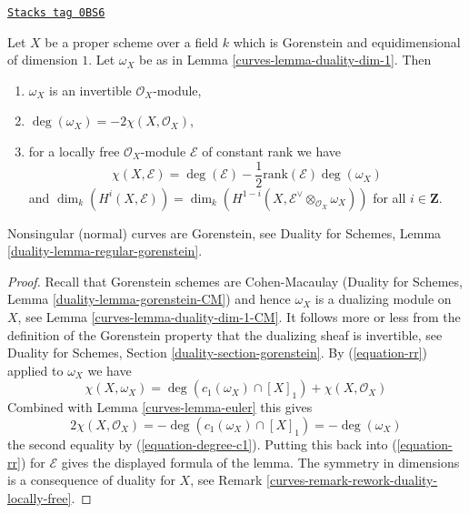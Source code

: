 \begin{lemma}

\label{curves-lemma-rr}
\href{https://stacks.math.columbia.edu/tag/0BS6}{\texttt{Stacks tag 0BS6}}

Let $X$ be a proper scheme over a field $k$ which is Gorenstein and
equidimensional of dimension $1$. Let $\omega_X$ be as in
Lemma \ref{curves-lemma-duality-dim-1}. Then
\begin{enumerate}
\item $\omega_X$ is an invertible $\mathcal{O}_X$-module,
\item $\deg(\omega_X) = -2\chi(X, \mathcal{O}_X)$,
\item for a locally free $\mathcal{O}_X$-module $\mathcal{E}$
of constant rank we have
$$
\chi(X, \mathcal{E}) = \deg(\mathcal{E}) -
\textstyle{\frac{1}{2}} \text{rank}(\mathcal{E}) \deg(\omega_X)
$$
and $\dim_k(H^i(X, \mathcal{E})) =
\dim_k(H^{1 - i}(X, \mathcal{E}^\vee \otimes_{\mathcal{O}_X} \omega_X))$
for all $i \in \mathbf{Z}$.
\end{enumerate}
\end{lemma}

Nonsingular (normal) curves are Gorenstein, see
Duality for Schemes, Lemma \ref{duality-lemma-regular-gorenstein}.

\begin{proof}

Recall that Gorenstein schemes are Cohen-Macaulay
(Duality for Schemes, Lemma \ref{duality-lemma-gorenstein-CM})
and hence $\omega_X$ is a dualizing module on $X$, see
Lemma \ref{curves-lemma-duality-dim-1-CM}.
It follows more or less from the definition of the Gorenstein property
that the dualizing sheaf is invertible, see
Duality for Schemes, Section \ref{duality-section-gorenstein}.
By (\ref{equation-rr}) applied to $\omega_X$ we have
$$
\chi(X, \omega_X) =
\deg(c_1(\omega_X) \cap [X]_1) + \chi(X, \mathcal{O}_X)
$$
Combined with Lemma \ref{curves-lemma-euler} this gives
$$
2\chi(X, \mathcal{O}_X) = - \deg(c_1(\omega_X) \cap [X]_1) = - \deg(\omega_X)
$$
the second equality by (\ref{equation-degree-c1}). Putting this back into
(\ref{equation-rr}) for $\mathcal{E}$ gives the displayed formula of the lemma.
The symmetry in dimensions is a consequence of duality for $X$, see
Remark \ref{curves-remark-rework-duality-locally-free}.
\end{proof}

